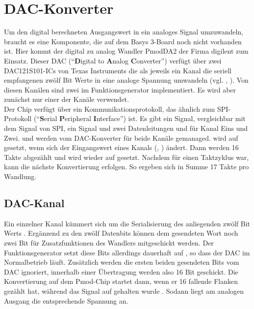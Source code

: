 \section{DAC-Konverter} \label{Comp:DAC}
Um den digital berechneten Ausgangswert in ein analoges Signal umzuwandeln, braucht es eine Komponente, die auf dem Basys 3-Board noch nicht vorhanden ist.
Hier kommt der digital zu analog Wandler PmodDA2 der Firma digilent zum Einsatz.
Dieser DAC (``\textbf{D}igital to \textbf{A}nalog \textbf{C}onverter'') verfügt über zwei DAC121S101-ICs von Texas Instruments die als jeweils ein Kanal die seriell empfangenen zwölf Bit Werte in eine analoge Spannung umwandeln (vgl. \cite{DAC121S101}, \cite{PmodDA2}).
Von diesen Kanälen sind zwei im Funktionsgenerator implementiert.
Es wird aber zunächst nur einer der Kanäle verwendet.\\
Der Chip verfügt über ein Kommunikationsprotokoll, das ähnlich zum SPI-Protokoll (``\textbf{S}erial \textbf{P}eripheral \textbf{I}nterface'') ist.
Es gibt ein  Signal, vergleichbar mit dem  Signal von SPI, ein  Signal und zwei Datenleitungen  und  für Kanal Eins und Zwei.
 und  werden vom DAC-Konverter für beide Kanäle gemanaged.
 wird auf  gesetzt, wenn sich der Eingangswert eines Kanals (, ) ändert.
Dann werden 16 Takte abgezählt und  wird wieder auf  gesetzt.
Nachdem  für einen Taktzyklus  war, kann die nächste Konvertierung erfolgen.
So ergeben sich in Summe 17 Takte pro Wandlung.

\subsection{DAC-Kanal} \label{Comp:DAC:Channel}
Ein einzelner Kanal kümmert sich um die Serialisierung des anliegenden zwölf Bit Werts .
Ergänzend zu den zwölf Datenbits können dem gesendeten Wort noch zwei Bit für Zusatzfunktionen des Wandlers mitgeschickt werden.
Der Funktionsgenerator setzt diese Bits allerdings dauerhaft auf , so dass der DAC im Normalbetrieb läuft.
Zusätzlich werden die ersten beiden gesendeten Bits vom DAC ignoriert, innerhalb einer Übertragung werden also 16 Bit geschickt.
Die Konvertierung auf dem Pmod-Chip startet dann, wenn er 16 fallende  Flanken gezählt hat, während das  Signal auf  gehalten wurde \cite{DAC121S101}.
Sodann liegt am analogen Ausgang die entsprechende Spannung an.

